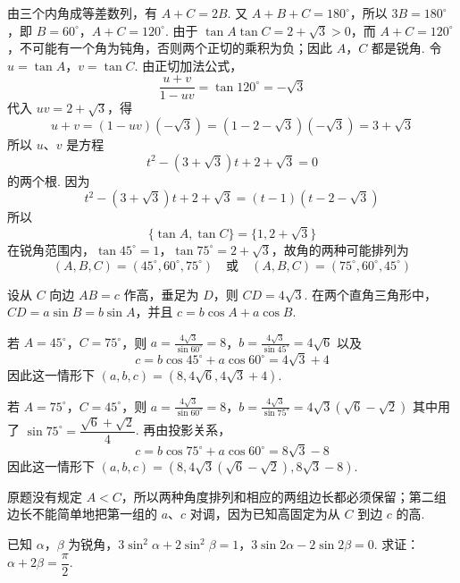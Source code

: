 \begin{solution}
由三个内角成等差数列，有 \(A+C=2B\). 又 \(A+B+C=180^{\circ}\)，所以 \(3B=180^{\circ}\)，即
\(B=60^{\circ}\)，\(A+C=120^{\circ}\).
由于 \(\tan A\tan C=2+\sqrt{3}>0\)，而 \(A+C=120^{\circ}\)，不可能有一个角为钝角，否则两个正切的乘积为负；因此 \(A\)，\(C\) 都是锐角. 令 \(u=\tan A\)，\(v=\tan C\). 由正切加法公式，
\[
\frac{u+v}{1-uv}=\tan120^{\circ}=-\sqrt{3}
\]
代入 \(uv=2+\sqrt{3}\)，得
\[
u+v=(1-uv)(-\sqrt{3})=(1-2-\sqrt{3})(-\sqrt{3})=3+\sqrt{3}
\]
所以 \(u\)、\(v\) 是方程
\[
t^{2}-(3+\sqrt{3})t+2+\sqrt{3}=0
\]
的两个根. 因为
\[
t^{2}-(3+\sqrt{3})t+2+\sqrt{3}=(t-1)(t-2-\sqrt{3})
\]
所以
\[
\{\tan A,\tan C\}=\{1,2+\sqrt{3}\}
\]
在锐角范围内，\(\tan45^{\circ}=1\)，\(\tan75^{\circ}=2+\sqrt{3}\)，故角的两种可能排列为
\[
(A,B,C)=(45^{\circ},60^{\circ},75^{\circ})
\quad\text{或}\quad
(A,B,C)=(75^{\circ},60^{\circ},45^{\circ})
\]

设从 \(C\) 向边 \(AB=c\) 作高，垂足为 \(D\)，则 \(CD=4\sqrt{3}\). 在两个直角三角形中，\(CD=a\sin B=b\sin A\)，并且 \(c=b\cos A+a\cos B\).

若 \(A=45^{\circ}\)，\(C=75^{\circ}\)，则
\(a=\frac{4\sqrt{3}}{\sin60^{\circ}}=8\)，\(b=\frac{4\sqrt{3}}{\sin45^{\circ}}=4\sqrt{6}\)
以及
\[
c=b\cos45^{\circ}+a\cos60^{\circ}=4\sqrt{3}+4
\]
因此这一情形下 \((a,b,c)=(8,4\sqrt{6},4\sqrt{3}+4)\).

若 \(A=75^{\circ}\)，\(C=45^{\circ}\)，则
\(a=\frac{4\sqrt{3}}{\sin60^{\circ}}=8\)，\(b=\frac{4\sqrt{3}}{\sin75^{\circ}}=4\sqrt{3}\left(\sqrt{6}-\sqrt{2}\right)\)
其中用了 \(\sin75^{\circ}=\dfrac{\sqrt{6}+\sqrt{2}}{4}\). 再由投影关系，
\[
c=b\cos75^{\circ}+a\cos60^{\circ}=8\sqrt{3}-8
\]
因此这一情形下 \((a,b,c)=\left(8,4\sqrt{3}\left(\sqrt{6}-\sqrt{2}\right),8\sqrt{3}-8\right)\).

原题没有规定 \(A<C\)，所以两种角度排列和相应的两组边长都必须保留；第二组边长不能简单地把第一组的 \(a\)、\(c\) 对调，因为已知高固定为从 \(C\) 到边 \(c\) 的高.
\end{solution}

\begin{problem}
已知 \(\alpha\)，\(\beta\) 为锐角，\(3\sin^{2}\alpha+2\sin^{2}\beta=1\)，\(3\sin2\alpha-2\sin2\beta=0\). 求证：\(\alpha+2\beta=\dfrac{\pi}{2}\).
\end{problem}

